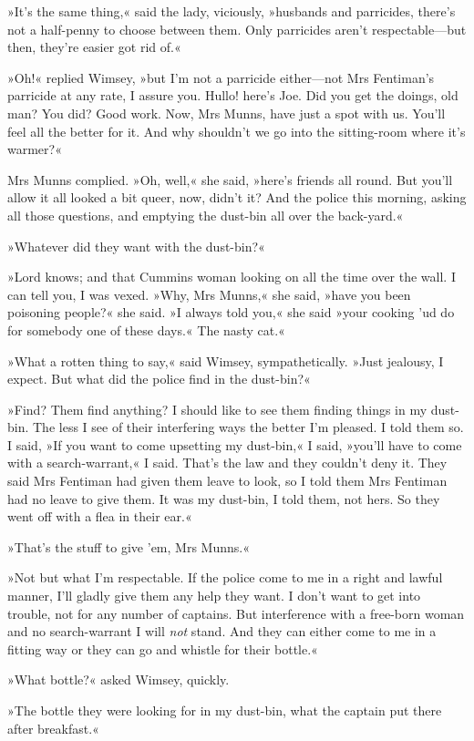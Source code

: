 »It's the same thing,« said the lady, viciously, »husbands and parricides, there's not a half-penny to choose between them. Only parricides aren't respectable—but then, they're easier got rid of.«

»Oh!« replied Wimsey, »but I'm not a parricide either—not Mrs Fentiman's parricide at any rate, I assure you. Hullo! here's Joe. Did you get the doings, old man? You did? Good work. Now, Mrs Munns, have just a spot with us. You'll feel all the better for it. And why shouldn't we go into the sitting-room where it's warmer?«

Mrs Munns complied. »Oh, well,« she said, »here's friends all round. But you'll allow it all looked a bit queer, now, didn't it? And the police this morning, asking all those questions, and emptying the dust-bin all over the back-yard.«

»Whatever did they want with the dust-bin?«

»Lord knows; and that Cummins woman looking on all the time over the wall. I can tell you, I was vexed. »Why, Mrs Munns,« she said, »have you been poisoning people?« she said. »I always told you,« she said »your cooking 'ud do for somebody one of these days.« The nasty cat.«

»What a rotten thing to say,« said Wimsey, sympathetically. »Just jealousy, I expect. But what did the police find in the dust-bin?«

»Find? Them find anything? I should like to see them finding things in my dust-bin. The less I see of their interfering ways the better I'm pleased. I told them so. I said, »If you want to come upsetting my dust-bin,« I said, »you'll have to come with a search-warrant,« I said. That's the law and they couldn't deny it. They said Mrs Fentiman had given them leave to look, so I told them Mrs Fentiman had no leave to give them. It was my dust-bin, I told them, not hers. So they went off with a flea in their ear.«

»That's the stuff to give 'em, Mrs Munns.«

»Not but what I'm respectable. If the police come to me in a right and lawful manner, I'll gladly give them any help they want. I don't want to get into trouble, not for any number of captains. But interference with a free-born woman and no search-warrant I will \textit{not} stand. And they can either come to me in a fitting way or they can go and whistle for their bottle.«

»What bottle?« asked Wimsey, quickly.

»The bottle they were looking for in my dust-bin, what the captain put there after breakfast.«

